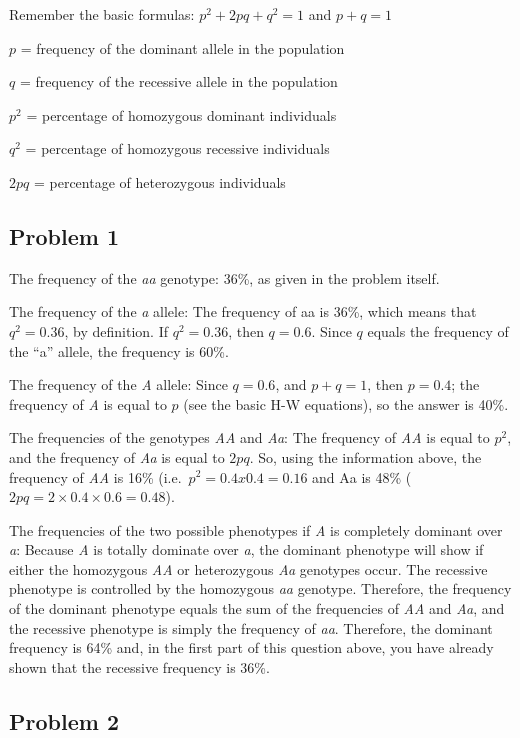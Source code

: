 \documentclass[
  a4paper]{book}
\begin{document}
Remember the basic formulas:
\(p^2 + 2pq + q^2 = 1\) and \(p + q = 1\)

\(p\) = frequency of the dominant allele in the population

\(q\) = frequency of the recessive allele in the population

\(p^2\) = percentage of homozygous dominant individuals

\(q^2\) = percentage of homozygous recessive individuals

\(2pq\) = percentage of heterozygous individuals

\hypertarget{problem-1}{%
\subsection{Problem 1}\label{problem-1}}

The frequency of the \emph{aa} genotype: 36\%, as given in the problem itself.

The frequency of the \emph{a} allele: The frequency of aa is 36\%, which means that \(q^2 = 0.36\), by definition. If \(q^2 = 0.36\), then \(q = 0.6\). Since \(q\) equals the frequency of the ``a'' allele, the frequency is 60\%.

The frequency of the \emph{A} allele: Since \(q = 0.6\), and \(p + q = 1\), then \(p = 0.4\); the frequency of \emph{A} is equal to \(p\) (see the basic H-W equations), so the answer is 40\%.

The frequencies of the genotypes \emph{AA} and \emph{Aa}: The frequency of \emph{AA} is equal to \(p^2\), and the frequency of \emph{Aa} is equal to \(2pq\). So, using the information above, the frequency of \emph{AA} is 16\% (i.e.~\(p^2 = 0.4 x 0.4 = 0.16\) and Aa is 48\% (\(2pq = 2 \times 0.4 \times 0.6 = 0.48\)).

The frequencies of the two possible phenotypes if \emph{A} is completely dominant over \emph{a}: Because \emph{A} is totally dominate over \emph{a}, the dominant phenotype will show if either the homozygous \emph{AA} or heterozygous \emph{Aa} genotypes occur. The recessive phenotype is controlled by the homozygous \emph{aa} genotype. Therefore, the frequency of the dominant phenotype equals the sum of the frequencies of \emph{AA} and \emph{Aa}, and the recessive phenotype is simply the frequency of \emph{aa}. Therefore, the dominant frequency is 64\% and, in the first part of this question above, you have already shown that the recessive frequency is 36\%.

\hypertarget{problem-2}{%
\subsection{Problem 2}\label{problem-2}}
\end{document}
